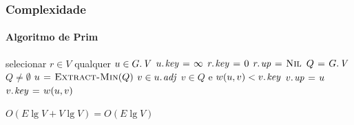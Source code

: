 \documentclass{beamer}
\begin{document}
\begin{frame}
\frametitle{Complexidade}
\framesubtitle{Algoritmo de Prim}

\begin{codebox}
\li selecionar $r \in V$ qualquer
\li \For $u \in \attrib{G}{V}$ 
\li \Do $\attrib{u}{key} \gets \infty$
    \End
\li $\attrib{r}{key} \gets 0$
\li $\attrib{r}{up} \gets \const{Nil}$
\li $Q \gets \attrib{G}{V}$   
\li \While $Q \neq \emptyset$ 
\li \Do $u \mathrel{\hspace{1pt}=\hspace{1pt}} \textnormal{\scshape Extract-Min}(Q)$ 
\li   \For $v \in \attrib{u}{adj}$ 
\li   \Do \If $v \in Q$ e $w(u, v) < \attrib{v}{key}$ 
\li     \Then $\attrib{v}{up} \gets u$ 
\li       $\attrib{v}{key} \gets w(u, v)$  
        \End
      \End
    \End
\end{codebox}
\pause $O(E \lg V + V \lg V) = O(E \lg V)$
\end{frame}
\end{document}
